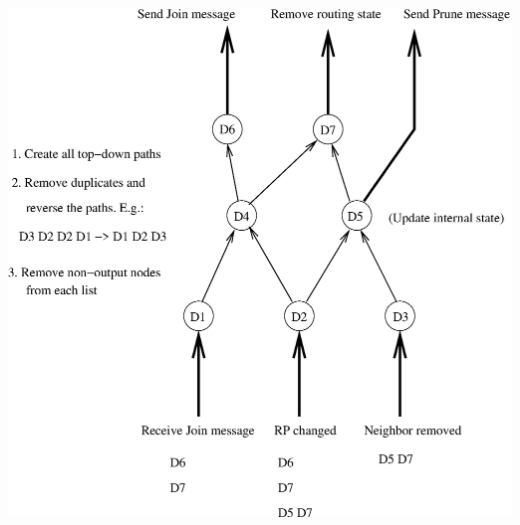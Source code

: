 \documentclass[landscape]{icsislides}
\begin{document}
\begin{slide}

\begin{center}
  \includegraphics[scale=0.6]{figs/pim_state_dependency4}
\end{center}

\end{slide}
\end{document}
